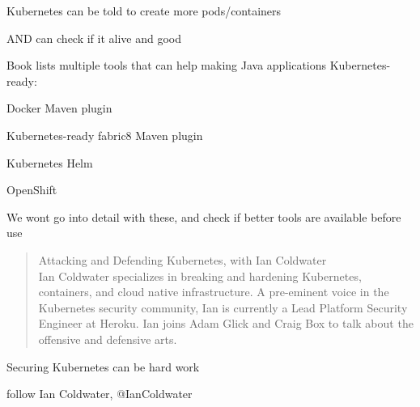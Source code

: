 \documentclass[Screen16to9,17pt]{foils}
\begin{document}


\begin{list2}
\item Kubernetes can be told to create more pods/containers
\item AND can check if it alive and good
\end{list2}





\begin{quote}

\end{quote}

Book lists multiple tools that can help making Java applications Kubernetes-ready:
\begin{list2}
\item Docker Maven plugin
\item Kubernetes-ready fabric8 Maven plugin
\item Kubernetes Helm
\item OpenShift
\end{list2}

We wont go into detail with these, and check if better tools are available before use



\begin{quote}
  Attacking and Defending Kubernetes, with Ian Coldwater\\
  Ian Coldwater specializes in breaking and hardening Kubernetes, containers, and cloud native infrastructure. A pre-eminent voice in the Kubernetes security community, Ian is currently a Lead Platform Security Engineer at Heroku. Ian joins Adam Glick and Craig Box to talk about the offensive and defensive arts.
\end{quote}
{\footnotesize{}}

\begin{list2}
  \item Securing Kubernetes can be hard work
  \item
  \item follow Ian Coldwater, @IanColdwater 
\end{list2}
\end{document}
